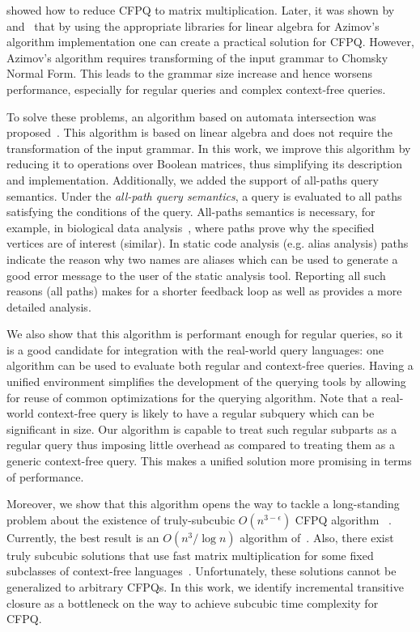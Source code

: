 \cite{Azimov:2018:CPQ:3210259.3210264} showed how to reduce CFPQ to matrix multiplication.
Later, it was shown by~\cite{Mishin:2019:ECP:3327964.3328503} and~\cite{10.1145/3398682.3399163} that by using the appropriate libraries for linear algebra for Azimov's algorithm implementation one can create a practical solution for CFPQ.
However, Azimov's algorithm requires transforming of the input grammar to Chomsky Normal Form.
This leads to the grammar size increase and hence worsens performance, especially for regular queries and complex context-free queries.

To solve these problems, an algorithm based on automata intersection was proposed~\citep{10.1007/978-3-030-54832-2_6}.
This algorithm is based on linear algebra and does not require the transformation of the input grammar.
In this work, we improve this algorithm by reducing it to operations over Boolean matrices, thus simplifying its description and implementation.
Additionally, we added the support of all-paths query semantics.
Under the \textit{all-path query semantics}, a query is evaluated to all paths satisfying the conditions of the query.
All-paths semantics is necessary, for example, in biological data analysis~\citep{GraphQueryWithEarley}, where paths prove why the specified vertices are of interest (similar).
In static code analysis (e.g. alias analysis) paths indicate the reason why two names are aliases which can be used to generate a good error message to the user of the static analysis tool. Reporting all such reasons (all paths) makes for a shorter feedback loop as well as provides a more detailed analysis.

We also show that this algorithm is performant enough for regular queries, so it is a good candidate for integration with the real-world query languages: one algorithm can be used to evaluate both regular and context-free queries.
Having a unified environment simplifies the development of the querying tools by allowing for reuse of common optimizations for the querying algorithm.
Note that a real-world context-free query is likely to have a regular subquery which can be significant in size.
Our algorithm is capable to treat such regular subparts as a regular query thus imposing little overhead as compared to treating them as a generic context-free query.
This makes a unified solution more promising in terms of performance.

Moreover, we show that this algorithm opens the way to tackle a long-standing problem about the existence of truly-subcubic $O(n^{3-\epsilon})$ CFPQ algorithm ~\citep{10.1145/1328438.1328460, Yannakakis}.
Currently, the best result is an $O(n^3/\log{n})$ algorithm of~\cite{10.1145/1328438.1328460}.
Also, there exist truly subcubic solutions that use fast matrix multiplication for some fixed subclasses of context-free languages~\citep{8249039}.
Unfortunately, these solutions cannot be generalized to arbitrary CFPQs.
In this work, we identify incremental transitive closure as a bottleneck on the way to achieve subcubic time complexity for CFPQ.

